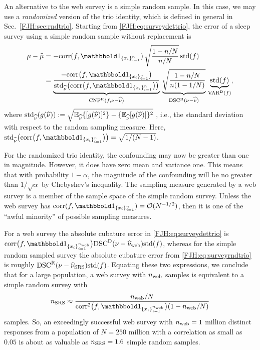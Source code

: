 \documentclass[graybox,footinfo]{svmult}
\begin{document}
An alternative to the web survey is a simple random sample.  In this 
case, we may use a 
\emph{randomized} version of the trio identity, which is defined in general in Sec.\  
\ref{FJH:sec:rndtrio}.  Starting 
from \eqref{FJH:eq:surveydettrio}, the 
error of a sleep survey using a simple random sample without replacement is
\begin{align}
\nonumber
\mu - \widehat{\mu} 
& = -\corr(f, \bbone_{\{x_i\}_{i=1}^n}) \,
\sqrt{\frac{1 - n/N}{n/N}} \, 
\std(f) \\
& = \underbrace{\frac{- \corr\bigl(f, \bbone_{\{x_i\}_{i=1}^n}\bigr)}
{\std_{\hnu} \bigl( \corr\bigl(f, \bbone_{\{x_i\}_{i=1}^n}\bigr)\bigr)}}_{\algn^\Rn(f,\nu - \hnu)} 
\, 
\underbrace{\sqrt{\frac{1-n/N}{n(1-1/N)}}}_{\disc^\Rn(\nu - \hnu)} \, 
\underbrace{\std(f)}_{\Var^\Dt(f)},
\label{FJH:eq:surveyrndtrio}
\end{align}
where $\textup{std}_{\widehat{\nu}}(g(\widehat{\nu})) := \sqrt{{\mathbb{E}}_{\widehat{\nu}}\{[g(\widehat{\nu})]^2 \}- 
\{{\mathbb{E}}_{\widehat{\nu}}[g(\widehat{\nu})]\}^2}$ , 
i.e., 
the standard deviation with 
respect to the random sampling 
measure.  Here, $\std_{\hnu} \bigl( \corr\bigl(f, 
\bbone_{\{x_i\}_{i=1}^n}\bigr)\bigr) = \sqrt{1/(N-1)}$.

For the randomized trio identity, the confounding may now be greater than one in 
magnitude.  However, it  does have zero mean and 
variance one.  This means that with probability $1-\alpha$, the magnitude of 
the confounding will be no greater than $1/\sqrt{\alpha}$ by Chebyshev's inequality. The 
sampling measure generated by a web survey is a member of the sample space of the 
simple random survey.  Unless the 
web survey has $\corr(f, \bbone_{\{x_i\}_{i=1}^n}) = \calO(N^{-1/2})$, then it is one of 
the ``awful minority'' of possible sampling measures.

For a web survey the absolute cubature error in \eqref{FJH:eq:surveydettrio} is 
$\corr\bigl(f, 
\bbone_{\{x_i\}_{i=1}^{n_{\textup{web}}}}\bigr) \disc^\Dt(\nu - \hnu_{\textup{web}}) \std(f)$, 
whereas for the simple random sampled survey the absolute cubature error from 
\eqref{FJH:eq:surveyrndtrio} is roughly $\textup{DSC}^{\textup{R}}(\nu - \widehat{\nu}_{\textup{SRS}}) \textup{std}(f)$.  
Equating these two expressions, we conclude that for a large population, a web survey with 
$n_{\textup{web}}$ samples is equivalent to a simple random survey with 
\[
n_{\textup{SRS}} \approx \frac{n_{\textup{web}}/N}{\corr^2\bigl(f, 
\bbone_{\{x_i\}_{i=1}^{n_{\textup{web}}}}\bigr)(1-n_{\textup{web}}/N)}
\]
samples.  So, an exceedingly successful web survey with $n_{\textup{web}} = 
1$ million distinct responses from a population of $N = 250$ million with a correlation as 
small as $0.05$ is about as 
valuable as $n_{\textup{SRS}} = 1.6$ simple random samples.
\end{document}
